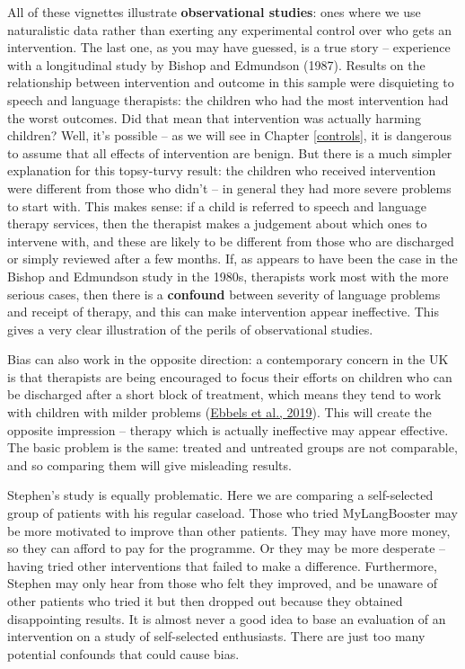 \documentclass{krantz}
\begin{document}
All of these vignettes illustrate \textbf{observational studies}: ones where we use naturalistic data rather than exerting any experimental control over who gets an intervention. The last one, as you may have guessed, is a true story -- experience with a longitudinal study by Bishop and Edmundson (1987). Results on the relationship between intervention and outcome in this sample were disquieting to speech and language therapists: the children who had the most intervention had the worst outcomes. Did that mean that intervention was actually harming children? Well, it's possible -- as we will see in Chapter \ref{controls}, it is dangerous to assume that all effects of intervention are benign. But there is a much simpler explanation for this topsy-turvy result: the children who received intervention were different from those who didn't -- in general they had more severe problems to start with. This makes sense: if a child is referred to speech and language therapy services, then the therapist makes a judgement about which ones to intervene with, and these are likely to be different from those who are discharged or simply reviewed after a few months. If, as appears to have been the case in the Bishop and Edmundson study in the 1980s, therapists work most with the more serious cases, then there is a \textbf{confound} between severity of language problems and receipt of therapy, and this can make intervention appear ineffective. This gives a very clear illustration of the perils of observational studies.

Bias can also work in the opposite direction: a contemporary concern in the UK is that therapists are being encouraged to focus their efforts on children who can be discharged after a short block of treatment, which means they tend to work with children with milder problems (\protect\hyperlink{ref-ebbels2019}{Ebbels et al., 2019}). This will create the opposite impression -- therapy which is actually ineffective may appear effective. The basic problem is the same: treated and untreated groups are not comparable, and so comparing them will give misleading results.

Stephen's study is equally problematic. Here we are comparing a self-selected group of patients with his regular caseload. Those who tried MyLangBooster may be more motivated to improve than other patients. They may have more money, so they can afford to pay for the programme. Or they may be more desperate -- having tried other interventions that failed to make a difference. Furthermore, Stephen may only hear from those who felt they improved, and be unaware of other patients who tried it but then dropped out because they obtained disappointing results. It is almost never a good idea to base an evaluation of an intervention on a study of self-selected enthusiasts. There are just too many potential confounds that could cause bias.
\end{document}
